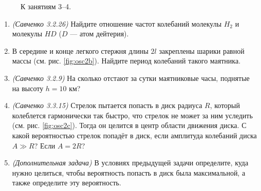 \documentclass[12pt]{article}
\newlength{\h}
\newlength{\x}
\begin{document}
\begin{enumerate}
\begin{figure}[ht]
{\begin{tikzpicture}
      \end{tikzpicture}
      \label{fig:osc2a}
    }
      \hspace{1cm}
    \hspace{1cm}
    \caption{К занятиям 3--4.}
    \label{fig:osc2}
  \end{figure}
  \begin{enumerate}
  \item \textit{(Савченко 3.2.26)} Найдите отношение частот колебаний
    молекулы $H_2$ и молекулы $HD$ ($D$ --- атом дейтерия).
  \item В середине и конце легкого стержня длины $2l$ закреплены шарики 
    равной массы (см. рис. \ref{fig:osc2b}). Найдите период колебаний
    такого маятника.
  \item \textit{(Савченко 3.2.9)} На сколько отстают за сутки
    маятниковые часы, поднятые на высоту $h=10$ км?
  \item \textit{(Савченко 3.3.15)} Стрелок пытается попасть в диск
    радиуса $R$, который колеблется гармонически так быстро, что
    стрелок не может за ним уследить (см. рис. \ref{fig:osc2c}). Тогда
    он целится в центр области движения диска. С какой вероятностью
    стрелок попадёт в диск, если амплитуда колебаний диска $A \gg R$?
    Если $A=2R$?
  \item \textit{(Дополнительная задача)} В условиях предыдущей задачи
    определите, куда нужно целиться, чтобы вероятность попасть в диск
    была максимальной, а также определите эту вероятность.
  \end{enumerate}
\end{enumerate}
\end{document}
